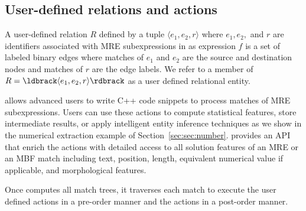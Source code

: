 \subsection{User-defined relations and actions}

A user-defined relation $R$ defined by a tuple 
$\langle e_1,e_2,r\rangle$ where 
$e_1,e_2,$ and $r$ are identifiers associated with MRE 
subexpressions in as expression $f$ is a set of labeled binary edges
where matches of $e_1$ and $e_2$ are the source and destination nodes
and matches of $r$ are the edge labels.
We refer to a member of $R=\ldbrack \langle e_1,e_2,r\rangle \rdbrack$ 
as a user defined relational entity.


\framework allows advanced users to write C++ code snippets 
to process matches of MRE subexpressions. 
Users can use these actions to compute statistical features, 
store intermediate results, or apply intelligent entity inference techniques
as we show in the numerical extraction example of Section~\ref{sec:sec:number}. 
\framework provides an API that enrich the actions with detailed access to
all solution features of an MRE or an MBF match including 
text, position, length, equivalent numerical value if applicable, 
and morphological features.

Once \framework computes all match trees, it traverses each match to 
execute the user defined  actions in a pre-order manner
and the  actions in a post-order manner.




